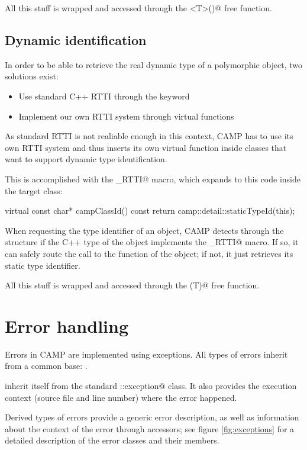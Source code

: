 \documentclass[a4paper, twoside]{report}
\begin{document}
	All this stuff is wrapped and accessed through the ()@ free function.

\section{Dynamic identification}

	In order to be able to retrieve the real dynamic type of a polymorphic object, two solutions exist:
	
	\begin{itemize}
		\item Use standard C++ RTTI through the \verb@typeid@ keyword
		\item Implement our own RTTI system through virtual functions
	\end{itemize}
	
	As standard RTTI is not realiable enough in this context, CAMP has to use its own RTTI system and thus
	inserts its own virtual function inside classes that want to support dynamic type identification.
	
	This is accomplished with the \verb@CAMP_RTTI@ macro, which expands to this code inside the target class:
	
\begin{cppcode}
virtual const char* campClassId() const
{
    return camp::detail::staticTypeId(this);
}
\end{cppcode}

	When requesting the type identifier of an object, CAMP detects through the
	\verb@HasDynamicTypeId@ structure if the C++ type of the object implements the \verb@CAMP_RTTI@ macro.
	If so, it can safely route the call to the \verb@campClassId@ function of the object; if not,
	it just retrieves its static type identifier.
	
	All this stuff is wrapped and accessed through the \verb@typeId(T)@ free function.

\chapter{Error handling}

	Errors in CAMP are implemented using exceptions. All types of errors inherit from a common base:
	\verb@Error@.
	
	\verb@Error@ inherit itself from the standard \verb@std::exception@ class. It also provides the
	execution context (source file and line number) where the error happened.
	
	Derived types of errors provide a generic error description, as well as information about the context
	of the error through accessors; see	figure \ref{fig:exceptions} for a detailed description of the error
	classes and their members.
	
\end{document}
